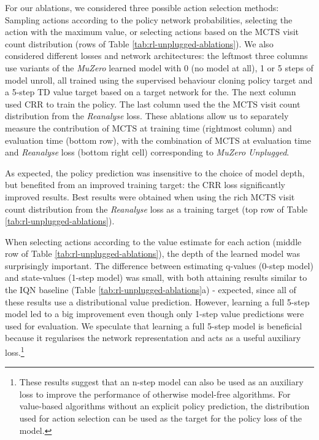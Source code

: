 \documentclass{article}
\newcommand{\muzero}{\emph{MuZero}}
\newcommand{\reanalyse}{\emph{Reanalyse}}
\newcommand{\mzunplugged}{\emph{MuZero Unplugged}}
\begin{document}
For our ablations, we considered three possible action selection methods: Sampling actions according to the policy network probabilities, selecting the action with the maximum value, or selecting actions based on the MCTS visit count distribution (rows of Table \ref{tab:rl-unplugged-ablations}). We also considered different losses and network architectures: the leftmost three columns use variants of the \muzero{} learned model with 0 (no model at all), 1 or 5 steps of model unroll, all trained using the supervised behaviour cloning policy target and a 5-step TD value target based on a target network for the. The next column used CRR to train the policy. The last column used the the MCTS visit count distribution from the \reanalyse{} loss. These ablations allow us to separately measure the contribution of MCTS at training time (rightmost column) and evaluation time (bottom row), with the combination of MCTS at evaluation time and \reanalyse{} loss (bottom right cell) corresponding to \mzunplugged{}.

As expected, the policy prediction was insensitive to the choice of model depth, but benefited from an improved training target: the CRR loss significantly improved results. Best results were obtained when using the rich MCTS visit count distribution from the \reanalyse{} loss as a training target (top row of Table \ref{tab:rl-unplugged-ablations}).

When selecting actions according to the value estimate for each action (middle row of Table \ref{tab:rl-unplugged-ablations}), the depth of the learned model was surprisingly important. The difference between estimating q-values (0-step model) and state-values (1-step model) was small, with both attaining results similar to the IQN baseline (Table \ref{tab:rl-unplugged-ablations}a) - expected, since all of these results use a distributional value prediction. However, learning a full 5-step model led to a big improvement even though only 1-step value predictions were used for evaluation. We speculate that learning a full 5-step model is beneficial because it regularises the network representation and acts as a useful auxiliary loss.\footnote{These results suggest that an n-step model can also be used as an auxiliary loss to improve the performance of otherwise model-free algorithms. For value-based algorithms without an explicit policy prediction, the distribution used for action selection can be used as the target for the policy loss of the model.}
\end{document}
